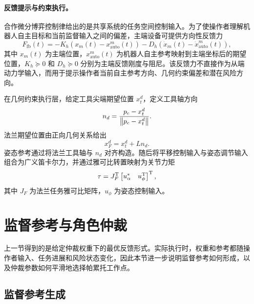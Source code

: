 \paragraph{反馈提示与约束执行。}
\label{subsec:ch3_feedback_execution}

合作微分博弈控制律给出的是共享系统的任务空间控制输入。为了使操作者理解机器人自主目标和当前监督输入之间的偏差，主端设备可提供方向性反馈力
\begin{equation}
  F_{\mathrm{fb}}(t)=-K_h(x_m(t)-x_{\mathrm{auto}}^m(t))-D_h(\dot x_m(t)-\dot x_{\mathrm{auto}}^m(t)),
  \label{eq:ch3_feedback_force}
\end{equation}
其中 $x_m(t)$ 为主端位置，$x_{\mathrm{auto}}^m(t)$ 为机器人自主参考映射到主端坐标后的期望位置，$K_h\succeq0$ 和 $D_h\succeq0$ 分别为主端反馈刚度与阻尼。该反馈力不直接作为从端动力学输入，而用于提示操作者当前自主参考方向、几何约束偏差和潜在风险方向。

在几何约束执行层，给定工具尖端期望位置 $x_t^d$，定义工具轴方向
\begin{equation}
  n_d=\frac{p_c-x_t^d}{\left\lVert p_c-x_t^d\right\rVert} .
  \label{eq:ch3_nd}
\end{equation}
法兰期望位置由正向几何关系给出
\begin{equation}
  x_F^d=x_t^d+Ln_d .
  \label{eq:ch3_flange_pos}
\end{equation}
姿态参考通过将法兰工具轴与 $n_d$ 对齐构造。随后将平移控制输入与姿态调节输入组合为广义笛卡尔力，并通过雅可比转置映射为关节力矩
\begin{equation}
  \tau=J_F^{\mathrm{T}}\begin{bmatrix}u_\alpha^* & u_\phi^{\mathrm{T}}\end{bmatrix}^{\mathrm{T}},
  \label{eq:ch3_tau}
\end{equation}
其中 $J_F$ 为法兰任务雅可比矩阵，$u_\phi$ 为姿态控制输入。

\section{监督参考与角色仲裁}
\label{sec:ch3_arbitration}

上一节得到的是给定仲裁权重下的最优反馈形式。实际执行时，权重和参考都随操作者输入、任务进展和风险状态变化，因此本节进一步说明监督参考如何形成，以及仲裁参数如何平滑地选择帕累托工作点。

\subsection{监督参考生成}
\label{subsec:ch3_ref_generation}

